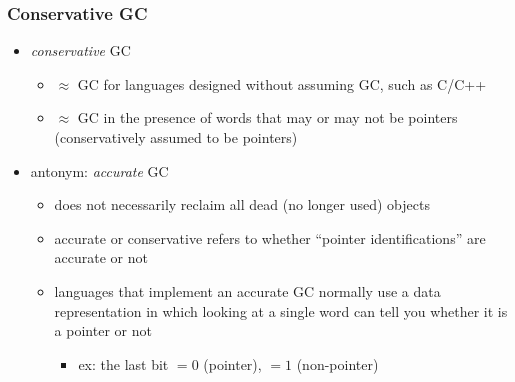 \documentclass[11pt,dvipdfmx]{beamer}
\newcommand{\ao}[1]{{\color{blue}#1}}
\begin{document}
\begin{frame}
\frametitle{Conservative GC}
\begin{itemize}
\item \ao{\it conservative} GC 
  \begin{itemize}
  \item<1-> $\approx$ GC for languages designed without assuming GC,
    such as C/C++
  \item<2-> $\approx$
    GC in the presence of words that may or may not be pointers
    (conservatively assumed to be pointers)
  \end{itemize}
\item<3-> antonym: \ao{\it accurate} GC
  \begin{itemize}
  \item does not necessarily reclaim all dead (no longer used) objects
  \item \ao{accurate} or \ao{conservative} refers to whether 
    ``pointer identifications'' are accurate or not
  \item languages that implement an accurate GC
    normally use a data representation in which
    looking at a single word can tell you whether it is a pointer or not
    \begin{itemize}
    \item ex: the last bit $= 0$ (pointer), $= 1$ (non-pointer)
    \end{itemize}
  \end{itemize}
\end{itemize}
\end{frame}
\fi
\end{document}
